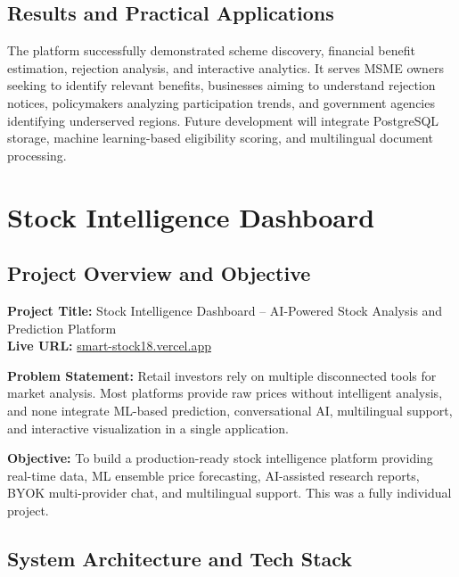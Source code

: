 \documentclass{book}
\begin{document}
\section{Results and Practical Applications}

\par\noindent The platform successfully demonstrated scheme discovery, financial benefit estimation, rejection analysis, and interactive analytics. It serves MSME owners seeking to identify relevant benefits, businesses aiming to understand rejection notices, policymakers analyzing participation trends, and government agencies identifying underserved regions. Future development will integrate PostgreSQL storage, machine learning-based eligibility scoring, and multilingual document processing.

\chapter{Stock Intelligence Dashboard}

\section{Project Overview and Objective}

\par\noindent \textbf{Project Title:} Stock Intelligence Dashboard -- AI-Powered Stock Analysis and Prediction Platform\\
\textbf{Live URL:} \href{https://smart-stock18.vercel.app}{smart-stock18.vercel.app}

\par\noindent \textbf{Problem Statement:} Retail investors rely on multiple disconnected tools for market analysis. Most platforms provide raw prices without intelligent analysis, and none integrate ML-based prediction, conversational AI, multilingual support, and interactive visualization in a single application.

\par\noindent \textbf{Objective:} To build a production-ready stock intelligence platform providing real-time data, ML ensemble price forecasting, AI-assisted research reports, BYOK multi-provider chat, and multilingual support. This was a fully individual project.

\section{System Architecture and Tech Stack}
\end{document}
